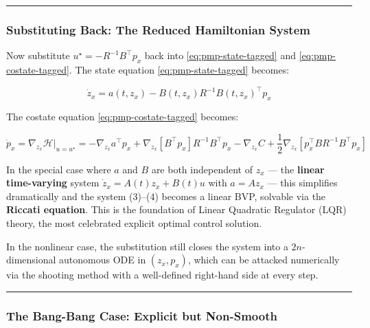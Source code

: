 \documentclass{article}
\begin{document}
\medskip\hrule\medskip

\subsubsection{Substituting Back: The Reduced Hamiltonian System}

\begin{examplebox}
Now substitute $u^\star = -R^{-1}B^\top p_x$ back into \eqref{eq:pmp-state-tagged} and \eqref{eq:pmp-costate-tagged}. The state equation \eqref{eq:pmp-state-tagged} becomes:

$$\dot{z}_x = a(t, z_x) - B(t, z_x) R^{-1} B(t, z_x)^\top p_x$$

The costate equation \eqref{eq:pmp-costate-tagged} becomes:

$$\dot{p}_x = \nabla_{z_x} \mathcal{H}\big|_{u = u^\star} = -\nabla_{z_x} a^\top p_x + \nabla_{z_x}[B^\top p_x] R^{-1} B^\top p_x - \nabla_{z_x} C + \frac{1}{2}\nabla_{z_x}[p_x^\top B R^{-1} B^\top p_x]$$

In the special case where $a$ and $B$ are both independent of $z_x$ — the \textbf{linear time-varying} system $\dot{z}_x = A(t) z_x + B(t) u$ with $a = Az_x$ — this simplifies dramatically and the system (3)–(4) becomes a linear BVP, solvable via the \textbf{Riccati equation}. This is the foundation of Linear Quadratic Regulator (LQR) theory, the most celebrated explicit optimal control solution.

In the nonlinear case, the substitution still closes the system into a $2n$-dimensional autonomous ODE in $(z_x, p_x)$, which can be attacked numerically via the shooting method with a well-defined right-hand side at every step.
\end{examplebox}

\medskip\hrule\medskip

\subsubsection{The Bang-Bang Case: Explicit but Non-Smooth}
\end{document}

